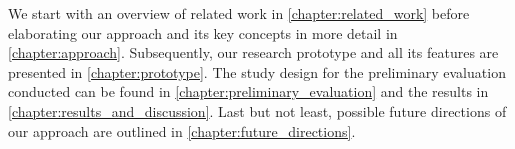 We start with an overview of related work in \autoref{chapter:related_work} before elaborating our approach and its key concepts in more detail in \autoref{chapter:approach}. Subsequently, our research prototype and all its features are presented in \autoref{chapter:prototype}. The study design for the preliminary evaluation conducted can be found in \autoref{chapter:preliminary_evaluation} and the results in \autoref{chapter:results_and_discussion}. Last but not least, possible future directions of our approach are outlined in \autoref{chapter:future_directions}.